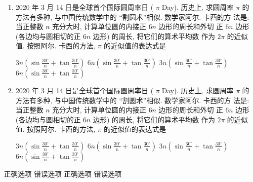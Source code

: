 \documentclass{ctexart}
\begin{document}
\begin{enumerate}
  \item 2020 年 3 月 14 日是全球首个国际圆周率日 ( $\pi$ Day). 历史上, 求圆周率 $\pi$ 的方法有多种, 与中国传统数学中的 “割圆术”相似. 数学家阿尔. 卡西的方 法是: 当正整数 $n$ 充分大时, 计算单位圆的内接正 $6 n$ 边形的周长和外切 正 $6 n$ 边形 (各边均与圆相切的正 $6 n$ 边形) 的周长, 将它们的算术平均数 作为 $2 \pi$ 的近似值. 按照阿尔. 卡西的方法, $\pi$ 的近似值的表达式是 \paren
    \begin{xchoice}[
      label-style = none,
      analysis-content = {
        It's obvious that A is false, then ...
      }
    ]
      \xitem
      $3 n(\sin \frac{30^{\circ}}{n}+\tan \frac{30^{\circ}}{n})$
      \xitem*
      $6 n(\sin \frac{30^{\circ}}{n}+\tan \frac{30^{\circ}}{n})$
      \xitem
      $3 n(\sin \frac{60^{\circ}}{n}+\tan \frac{30^{\circ}}{n})$
      \xitem
      $6 n(\sin \frac{30^{\circ}}{n}+\tan \frac{30^{\circ}}{n})$ 
    \end{xchoice}
  \item 2020 年 3 月 14 日是全球首个国际圆周率日 ( $\pi$ Day). 历史上, 求圆周率 $\pi$ 的方法有多种, 与中国传统数学中的 “割圆术”相似. 数学家阿尔. 卡西的方 法是: 当正整数 $n$ 充分大时, 计算单位圆的内接正 $6 n$ 边形的周长和外切 正 $6 n$ 边形 (各边均与圆相切的正 $6 n$ 边形) 的周长, 将它们的算术平均数 作为 $2 \pi$ 的近似值. 按照阿尔. 卡西的方法, $\pi$ 的近似值的表达式是 \paren
    \begin{xchoice}[
      analysis-content = {
        It's obvious that D is false, then ...
      }
    ]
      \xitem*
      $3 n(\sin \frac{30^{\circ}}{n}+\tan \frac{30^{\circ}}{n})$
      \xitem
      $6 n(\sin \frac{30^{\circ}}{n}+\tan \frac{30^{\circ}}{n})$
      \xitem*
      $3 n(\sin \frac{60^{\circ}}{n}+\tan \frac{30^{\circ}}{n})$
      \xitem
      $6 n(\sin \frac{30^{\circ}}{n}+\tan \frac{30^{\circ}}{n})$ 
    \end{xchoice}
\end{enumerate}

\begin{xchoice}[
  analysis-content = {
    It's obvious that D is false, then ...
  }
]
  \xitem* 正确选项
  \xitem  错误选项
  \xitem* 正确选项
  \xitem  错误选项
\end{xchoice}

\end{document}
